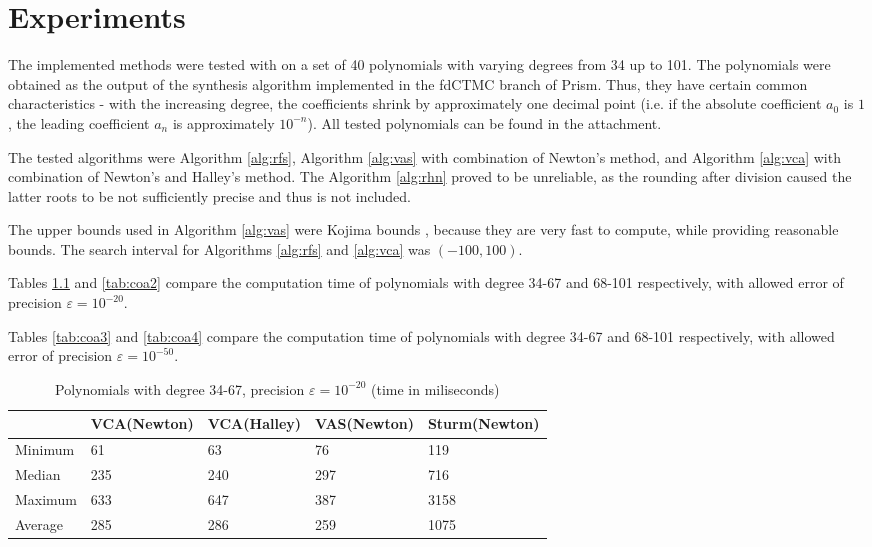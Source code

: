 \documentclass[
  digital, %
  notable,   %
  nolof,     %
  nolot,     %
	draft, %
]{fithesis3}
\begin{document}
\chapter{Experiments}
The implemented methods were tested with on a set of 40 polynomials with varying degrees from 34 up to 101. The polynomials were obtained as the output of the synthesis algorithm implemented in the fdCTMC branch of Prism. Thus, they have certain common characteristics - with the increasing degree, the coefficients shrink by approximately one decimal point (i.e. if the absolute coefficient $a_{0}$ is $1$, the leading coefficient $a_{n}$ is approximately $10^{-n}$). All tested polynomials can be found in the attachment.

The tested algorithms were Algorithm \ref{alg:rfs}, Algorithm \ref{alg:vas} with combination of Newton's method, and Algorithm \ref{alg:vca} with combination of Newton's and Halley's method. The Algorithm \ref{alg:rhn} proved to be unreliable, as the rounding after division caused the latter roots to be not sufficiently precise and thus is not included.

The upper bounds used in Algorithm \ref{alg:vas} were Kojima bounds \parencite{kojima}, because they are very fast to compute, while providing reasonable bounds. The search interval for Algorithms \ref{alg:rfs} and \ref{alg:vca} was $(-100, 100)$.

Tables \ref{tab:coa1} and \ref{tab:coa2} compare the computation time of polynomials with degree 34-67 and 68-101 respectively, with allowed error of precision $\varepsilon = 10^{-20}$. 

Tables \ref{tab:coa3} and \ref{tab:coa4} compare the computation time of polynomials with degree 34-67 and 68-101 respectively, with allowed error of precision $\varepsilon = 10^{-50}$. 

\begin{table}
  \begin{tabular*}{\textwidth}{lllll}
    \toprule
     & VCA(Newton) & VCA(Halley) & VAS(Newton) & Sturm(Newton) \\
    \midrule
			Minimum & 61 & 63 & 76 & 119 \\
			Median & 235 & 240 & 297 & 716 \\
			Maximum & 633 & 647 & 387 & 3158 \\
			Average & 285 & 286 & 259 & 1075 \\
    \bottomrule
  \end{tabular*}
  \caption{Polynomials with degree 34-67, precision $\varepsilon = 10^{-20}$ (time in miliseconds)}
  \label{tab:coa1}
\end{table}
\end{document}
